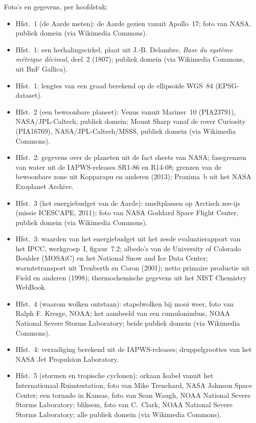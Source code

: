 \bigskip
\noindent Foto's en gegevens, per hoofdstuk:
\begin{itemize}\small
  \item Hfst.~1 (de Aarde meten): de Aarde gezien vanuit Apollo~17; foto van NASA, publiek domein (via Wikimedia Commons).
  \item Hfst.~1: een herhalingscirkel, plaat uit J.-B. Delambre, \emph{Base du système métrique décimal}, deel~2 (1807); publiek domein (via Wikimedia Commons, uit BnF Gallica).
  \item Hfst.~1: lengtes van een graad berekend op de ellipsoïde WGS~84 (EPSG-dataset).
  \item Hfst.~2 (een bewoonbare planeet): Venus vanuit Mariner~10 (PIA23791), NASA/JPL-Caltech, publiek domein; Mount Sharp vanaf de rover Curiosity (PIA16769), NASA/JPL-Caltech/MSSS, publiek domein (via Wikimedia Commons).
  \item Hfst.~2: gegevens over de planeten uit de fact sheets van NASA; fasegrenzen van water uit de IAPWS-releases SR1-86 en R14-08; grenzen van de bewoonbare zone uit Kopparapu en anderen (2013); Proxima~b uit het NASA Exoplanet Archive.
  \item Hfst.~3 (het energiebudget van de Aarde): smeltplassen op Arctisch zee-ijs (missie ICESCAPE, 2011); foto van NASA Goddard Space Flight Center, publiek domein (via Wikimedia Commons).
  \item Hfst.~3: waarden van het energiebudget uit het zesde evaluatierapport van het IPCC, werkgroep~I, figuur~7.2; albedo's van de University of Colorado Boulder (MOSAiC) en het National Snow and Ice Data Center; warmtetransport uit Trenberth en Caron (2001); netto primaire productie uit Field en anderen (1998); thermochemische gegevens uit het NIST Chemistry WebBook.
  \item Hfst.~4 (waarom wolken ontstaan): stapelwolken bij mooi weer, foto van Ralph F. Kresge, NOAA; het aambeeld van een cumulonimbus, NOAA National Severe Storms Laboratory; beide publiek domein (via Wikimedia Commons).
  \item Hfst.~4: verzadiging berekend uit de IAPWS-releases; druppelgroottes van het NASA Jet Propulsion Laboratory.
  \item Hfst.~5 (stormen en tropische cyclonen): orkaan Isabel vanuit het Internationaal Ruimtestation, foto van Mike Trenchard, NASA Johnson Space Center; een tornado in Kansas, foto van Sean Waugh, NOAA National Severe Storms Laboratory; bliksem, foto van C.~Clark, NOAA National Severe Storms Laboratory; alle publiek domein (via Wikimedia Commons).

\end{itemize}
